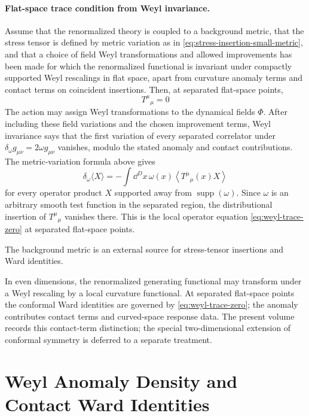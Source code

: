 \paragraph{Flat-space trace condition from Weyl invariance.}
Assume that the renormalized theory is coupled to a background metric, that
the stress tensor is defined by metric variation as in
\eqref{eq:stress-insertion-small-metric}, and that a choice of field Weyl
transformations and allowed improvements has been made for which the
renormalized functional is invariant under compactly supported Weyl
rescalings in flat space, apart from curvature anomaly terms and contact terms
on coincident insertions.  Then, at separated flat-space points,
\begin{equation}
  T^\mu{}_\mu=0
  \label{eq:weyl-trace-zero}
\end{equation}
The action may assign Weyl transformations to the dynamical fields \(\Phi\).
After including these field variations and the chosen improvement terms, Weyl
invariance says that the first variation of every separated correlator under
\(\delta_\omega g_{\mu\nu}=2\omega g_{\mu\nu}\) vanishes, modulo the stated
anomaly and contact contributions.  The metric-variation formula above gives
\[
  \delta_\omega\langle X\rangle
  =
  -\int\dd^Dx\,\omega(x)
  \left\langle T^\mu{}_\mu(x)X\right\rangle
\]
for every operator product \(X\) supported away from
\(\operatorname{supp}(\omega)\).  Since \(\omega\) is an arbitrary smooth test
function in the separated region, the distributional insertion of
\(T^\mu{}_\mu\) vanishes there.  This is the local operator equation
\eqref{eq:weyl-trace-zero} at separated flat-space points.

The background metric is an external source for stress-tensor insertions and
Ward identities.

In even dimensions, the renormalized generating functional may transform
under a Weyl rescaling by a local curvature functional.  At separated
flat-space points the conformal Ward identities are governed by
\eqref{eq:weyl-trace-zero}; the anomaly contributes contact terms and
curved-space response data.  The present volume records this contact-term
distinction; the special two-dimensional extension of conformal symmetry is
deferred to a separate treatment.

\section{Weyl Anomaly Density and Contact Ward Identities}

